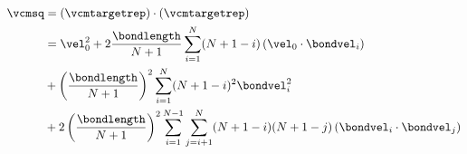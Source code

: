 \begin{equation}
\label{eq:vcmsq}
\begin{aligned}
    \vcmsq
      &= \left(\vcmtargetrep\right) \cdot \left(\vcmtargetrep\right) \\
      &= \vel^2_{0}
        + 2 \frac{\bondlength}{N+1}\sum_{i=1}^{N}(N + 1 - i)
          \left(
            \vel_{0} \cdot \bondvel_{i}
          \right) \\
      &+ \left(\frac{\bondlength }{N+1}\right)^2
          \sum_{i=1}^{N} (N + 1 - i)^2 \bondvel^2_{i} \\
      &+ 2 \left(\frac{\bondlength}{N+1}\right)^2
          \sum_{i=1}^{N-1}\sum_{j=i+1}^{N}
            (N + 1 - i)(N + 1 - j)
          \left(
            \bondvel_{i} \cdot \bondvel_{j}
          \right) \\
\end{aligned}
\end{equation}
